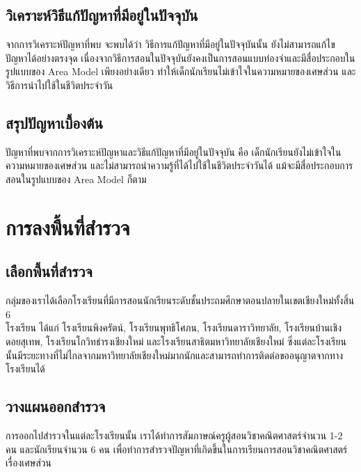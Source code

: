\subsection{วิเคราะห์วิธีแก้ปัญหาที่มีอยู่ในปัจจุบัน}
จากการวิเคราะห์ปัญหาที่พบ จะพบได้ว่า วิธีการแก้ปัญหาที่มีอยู่ในปัจจุบันนั้น ยังไม่สามารถแก้ไขปัญหาได้อย่างตรงจุด
 เนื่องจากวิธีการสอนในปัจจุบันยังคงเป็นการสอนแบบท่องจำและมีสื่อประกอบในรูปแบบของ Area Model เพียงอย่างเดียว
 ทำให้เด็กนักเรียนไม่เข้าใจในความหมายของเศษส่วน และวิธีการนำไปใช้ในชีวิตประจำวัน
 
\subsection{สรุปปัญหาเบื้องต้น}
ปัญหาที่พบจากการวิเคราะห์ปัญหาและวิธีแก้ปัญหาที่มีอยู่ในปัจจุบัน คือ เด็กนักเรียนยังไม่เข้าใจใน\\ความหมายของเศษส่วน
 และไม่สามารถนำความรู้ที่ได้ไปใช้ในชีวิตประจำวันได้ แม้จะมีสื่อประกอบการสอนในรูปแบบของ Area Model ก็ตาม

\section{การลงพื้นที่สำรวจ}

\subsection{เลือกพี้นที่สำรวจ}
กลุ่มของเราได้เลือกโรงเรียนที่มีการสอนนักเรียนระดับชั้นประถมศึกษาตอนปลายในเขตเชียงใหม่ทั้งสิ้น 6 \\โรงเรียน ได้แก่ โรงเรียนพิงครัตน์, โรงเรียนพุทธิโศภน, โรงเรียนดาราวิทยาลัย, โรงเรียนบ้านเชิงดอยสุเทพ, โรงเรียนโกวิทธำรงเชียงใหม่ และโรงเรียนสาธิตมหาวิทยาลัยเชียงใหม่
 ซึ่งแต่ละโรงเรียนนั้นมีระยะทางที่ไม่ไกลจากมหาวิทยาลัยเชียงใหม่มากนักและสามารถทำการติดต่อขออนุญาตจากทางโรงเรียนได้

\subsection{วางแผนออกสำรวจ}
การออกไปสำรวจในแต่ละโรงเรียนนั้น เราได้ทำการสัมภาษณ์ครูผู้สอนวิชาคณิตศาสตร์จำนวน 1-2 คน และนักเรียนจำนวน 6 คน
 เพื่อทำการสำรวจปัญหาที่เกิดขึ้นในการเรียนการสอนวิชาคณิตศาสตร์เรื่องเศษส่วน